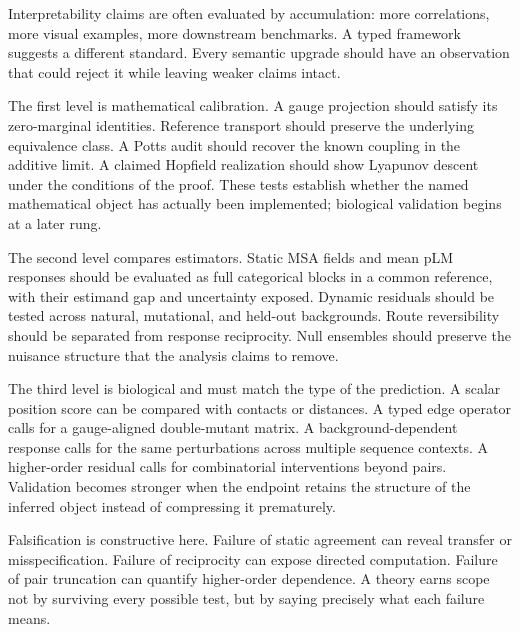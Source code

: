 Interpretability claims are often evaluated by accumulation: more correlations, more visual
examples, more downstream benchmarks.  A typed framework suggests a different standard.  Every
semantic upgrade should have an observation that could reject it while leaving weaker claims
intact.

The first level is mathematical calibration.  A gauge projection should satisfy its zero-marginal
identities.  Reference transport should preserve the underlying equivalence class.  A Potts audit
should recover the known coupling in the additive limit.  A claimed Hopfield realization should
show Lyapunov descent under the conditions of the proof.  These tests establish whether the named
mathematical object has actually been implemented; biological validation begins at a later rung.

The second level compares estimators.  Static MSA fields and mean pLM responses should be evaluated
as full categorical blocks in a common reference, with their estimand gap and uncertainty exposed.
Dynamic residuals should be tested across natural, mutational, and held-out backgrounds.  Route
reversibility should be separated from response reciprocity.  Null ensembles should preserve the
nuisance structure that the analysis claims to remove.

The third level is biological and must match the type of the prediction.  A scalar position score
can be compared with contacts or distances.  A typed edge operator calls for a gauge-aligned
double-mutant matrix.  A background-dependent response calls for the same perturbations across
multiple sequence contexts.  A higher-order residual calls for combinatorial interventions beyond
pairs.  Validation becomes stronger when the endpoint retains the structure of the inferred
object instead of compressing it prematurely.

Falsification is constructive here.  Failure of static agreement can reveal transfer or
misspecification.  Failure of reciprocity can expose directed computation.  Failure of pair
truncation can quantify higher-order dependence.  A theory earns scope not by surviving every
possible test, but by saying precisely what each failure means.
